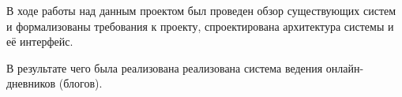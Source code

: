 




В ходе работы над данным проектом был проведен обзор существующих систем и формализованы требования к проекту, спроектирована архитектура
системы и её интерфейс.

В результате чего была реализована реализована система
ведения онлайн-дневников (блогов).

